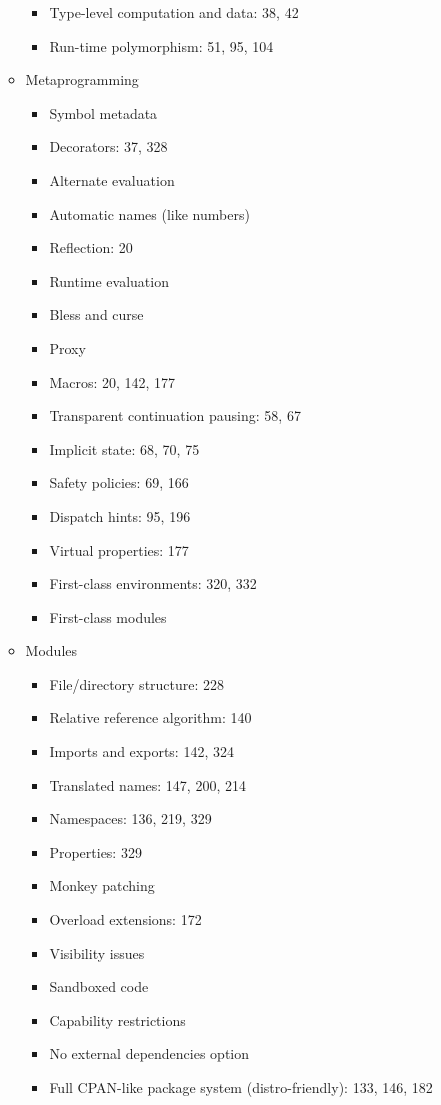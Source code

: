 \begin{itemize}
\begin{itemize}
\begin{itemize}
    \item Type-level computation and data: 38, 42
    \item Run-time polymorphism: 51, 95, 104
    \end{itemize}
  \item Metaprogramming
    \begin{itemize}
    \item Symbol metadata
    \item Decorators: 37, 328
    \item Alternate evaluation
    \item Automatic names (like numbers)
    \item Reflection: 20
    \item Runtime evaluation
    \item Bless and curse
    \item Proxy
    \item Macros: 20, 142, 177
    \item Transparent continuation pausing: 58, 67
    \item Implicit state: 68, 70, 75
    \item Safety policies: 69, 166
    \item Dispatch hints: 95, 196
    \item Virtual properties: 177
    \item First-class environments: 320, 332
    \item First-class modules
    \end{itemize}
  \item Modules
    \begin{itemize}
    \item File/directory structure: 228
    \item Relative reference algorithm: 140
    \item Imports and exports: 142, 324
    \item Translated names: 147, 200, 214
    \item Namespaces: 136, 219, 329
    \item Properties: 329
    \item Monkey patching
    \item Overload extensions: 172
    \item Visibility issues
    \item Sandboxed code
    \item Capability restrictions
    \item No external dependencies option
    \item Full CPAN-like package system (distro-friendly): 133, 146, 182

\end{itemize}
\end{itemize}
\end{itemize}
